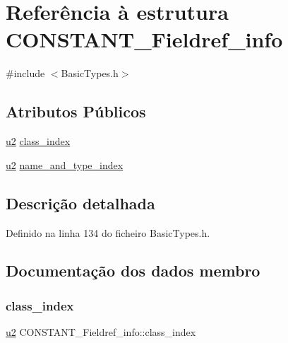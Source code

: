 \hypertarget{structCONSTANT__Fieldref__info}{}\section{Referência à estrutura C\+O\+N\+S\+T\+A\+N\+T\+\_\+\+Fieldref\+\_\+info}
\label{structCONSTANT__Fieldref__info}


{\ttfamily \#include $<$Basic\+Types.\+h$>$}

\subsection*{Atributos Públicos}
\begin{DoxyCompactItemize}
\item 
\hyperlink{BasicTypes_8h_a732cde1300aafb73b0ea6c2558a7a54f}{u2} \hyperlink{structCONSTANT__Fieldref__info_aab39f30321396337e533fd36ec23934c}{class\+\_\+index}
\item 
\hyperlink{BasicTypes_8h_a732cde1300aafb73b0ea6c2558a7a54f}{u2} \hyperlink{structCONSTANT__Fieldref__info_a9ccfe931ed030cef53ca1b079356fe31}{name\+\_\+and\+\_\+type\+\_\+index}
\end{DoxyCompactItemize}


\subsection{Descrição detalhada}


Definido na linha 134 do ficheiro Basic\+Types.\+h.



\subsection{Documentação dos dados membro}
\mbox{\label{structCONSTANT__Fieldref__info_aab39f30321396337e533fd36ec23934c}} 
\subsubsection{\texorpdfstring{class\+\_\+index}{class\_index}}
{\footnotesize\ttfamily \hyperlink{BasicTypes_8h_a732cde1300aafb73b0ea6c2558a7a54f}{u2} C\+O\+N\+S\+T\+A\+N\+T\+\_\+\+Fieldref\+\_\+info\+::class\+\_\+index}



